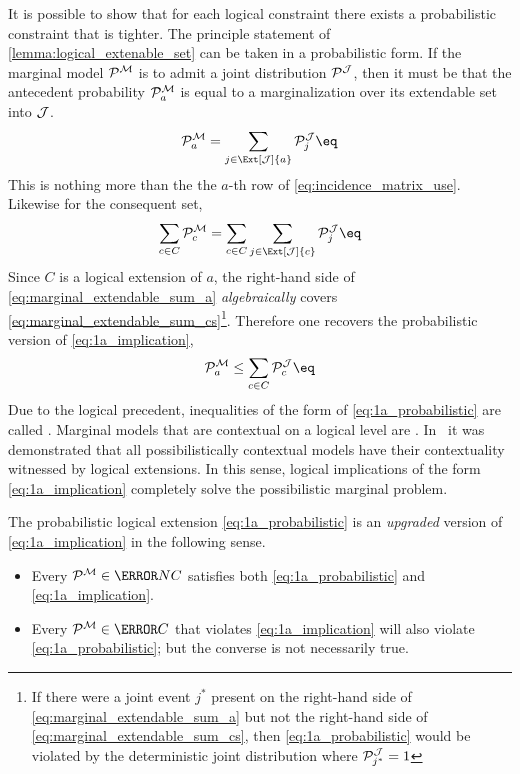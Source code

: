 \documentclass[aps, 10pt, english, twoside, pra, nofootinbib, longbibliography]{revtex4-1}
\begin{document}
    It is possible to show that for each logical constraint there exists a probabilistic constraint that is tighter. The principle statement of \cref{lemma:logical_extenable_set} can be taken in a probabilistic form. If the marginal model $\probvec^{\mscenario}$ is to admit a joint distribution $\probvec^{\jointvar}$, then it must be that the antecedent probability $\probvec^{\mscenario}_a$ is equal to a marginalization over its extendable set into $\mathcal{J}$.
    \[ \probvec^{\mscenario}_a = \sum_{j \in \Ext[\jointvar]{a}}\probvec^{\jointvar}_j \eq \label{eq:marginal_extendable_sum_a} \]
    This is nothing more than the the $a$-th row of \cref{eq:incidence_matrix_use}. Likewise for the consequent set,
    \[ \sum_{c \in C}\probvec^{\mscenario}_c = \sum_{c \in C}\sum_{j \in \Ext[\jointvar]{c}}\probvec^{\jointvar}_j \eq \label{eq:marginal_extendable_sum_cs} \]
    Since $C$ is a logical extension of $a$, the right-hand side of \cref{eq:marginal_extendable_sum_a} \textit{algebraically} covers \cref{eq:marginal_extendable_sum_cs}\footnote{If there were a joint event $j^*$ present on the right-hand side of \cref{eq:marginal_extendable_sum_a} but not the right-hand side of \cref{eq:marginal_extendable_sum_cs}, then \cref{eq:1a_probabilistic} would be violated by the deterministic joint distribution where $\probvec^{\jointvar}_{j^*} = 1$}. Therefore one recovers the probabilistic version of \cref{eq:1a_implication},
    \[ \probvec^{\mscenario}_a \leq \sum_{c \in C}\probvec^{\jointvar}_c \eq \label{eq:1a_probabilistic} \]
    Due to the logical precedent, inequalities of the form of \cref{eq:1a_probabilistic} are called . Marginal models that are contextual on a logical level are . In~\cite{Abramsky_2011} it was demonstrated that all possibilistically contextual models have their contextuality witnessed by logical extensions. In this sense, logical implications of the form \cref{eq:1a_implication} completely solve the possibilistic marginal problem.
    \begin{remark}
        The probabilistic logical extension \cref{eq:1a_probabilistic} is an \textit{upgraded} version of \cref{eq:1a_implication} in the following sense.
        \begin{itemize}
            \item Every $\probvec^{\mscenario} \in \s{NC}$ satisfies both \cref{eq:1a_probabilistic} and \cref{eq:1a_implication}.
            \item Every $\probvec^{\mscenario} \in \s{C}$ that violates \cref{eq:1a_implication} will also violate \cref{eq:1a_probabilistic}; but the converse is not necessarily true.
        \end{itemize}
    \end{remark}
\end{document}
